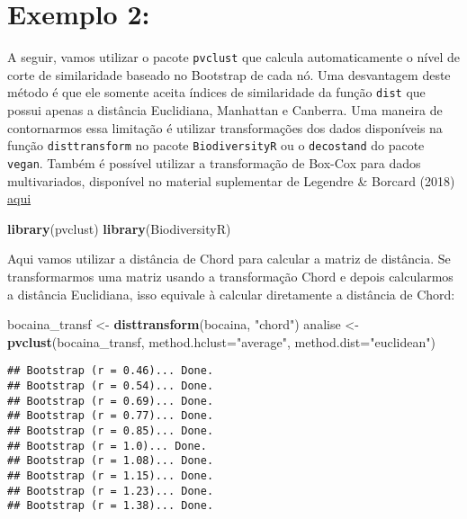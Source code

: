 \documentclass[
]{book}
\newenvironment{Shaded}{\begin{snugshade}}{\end{snugshade}}
\newcommand{\DataTypeTok}[1]{\textcolor[rgb]{0.13,0.29,0.53}{#1}}
\newcommand{\KeywordTok}[1]{\textcolor[rgb]{0.13,0.29,0.53}{\textbf{#1}}}
\newcommand{\NormalTok}[1]{#1}
\newcommand{\StringTok}[1]{\textcolor[rgb]{0.31,0.60,0.02}{#1}}
\begin{document}
\hypertarget{exemplo-2}{%
\section{Exemplo 2:}\label{exemplo-2}}

A seguir, vamos utilizar o pacote \texttt{pvclust} que calcula automaticamente o nível de corte de similaridade baseado no Bootstrap de cada nó. Uma desvantagem deste método é que ele somente aceita índices de similaridade da função \texttt{dist} que possui apenas a distância Euclidiana, Manhattan e Canberra. Uma maneira de contornarmos essa limitação é utilizar transformações dos dados disponíveis na função \texttt{disttransform} no pacote \texttt{BiodiversityR} ou o \texttt{decostand} do pacote \texttt{vegan}. Também é possível utilizar a transformação de Box-Cox para dados multivariados, disponível no material suplementar de Legendre \& Borcard (2018) \href{http://www.ecography.org/appendix/ecog-03498}{aqui}

\begin{Shaded}
\begin{Highlighting}[]
\KeywordTok{library}\NormalTok{(pvclust)}
\KeywordTok{library}\NormalTok{(BiodiversityR)}
\end{Highlighting}
\end{Shaded}

Aqui vamos utilizar a distância de Chord para calcular a matriz de distância. Se transformarmos uma matriz usando a transformação Chord e depois calcularmos a distância Euclidiana, isso equivale à calcular diretamente a distância de Chord:

\begin{Shaded}
\begin{Highlighting}[]
\NormalTok{bocaina_transf <-}\StringTok{ }\KeywordTok{disttransform}\NormalTok{(bocaina, }\StringTok{"chord"}\NormalTok{)}
\NormalTok{analise <-}\StringTok{ }\KeywordTok{pvclust}\NormalTok{(bocaina_transf, }\DataTypeTok{method.hclust=}\StringTok{"average"}\NormalTok{, }\DataTypeTok{method.dist=}\StringTok{"euclidean"}\NormalTok{) }
\end{Highlighting}
\end{Shaded}

\begin{verbatim}
## Bootstrap (r = 0.46)... Done.
## Bootstrap (r = 0.54)... Done.
## Bootstrap (r = 0.69)... Done.
## Bootstrap (r = 0.77)... Done.
## Bootstrap (r = 0.85)... Done.
## Bootstrap (r = 1.0)... Done.
## Bootstrap (r = 1.08)... Done.
## Bootstrap (r = 1.15)... Done.
## Bootstrap (r = 1.23)... Done.
## Bootstrap (r = 1.38)... Done.
\end{verbatim}
\end{document}

